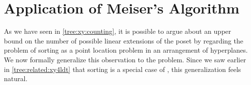 \chapter{Application of Meiser's Algorithm}

As we have seen in \ref{tree:xy:counting}, it is possible to argue about an
upper bound on the number of possible linear extensions of the poset \XY by
regarding the problem of sorting \XY as a point location problem in an
arrangement of hyperplanes. We now formally generalize this observation
to the \kSUM problem. Since we saw earlier in \ref{tree:related:xy4ldt} that
sorting \XY is a special case of \fourLDT, this generalization feels natural.

